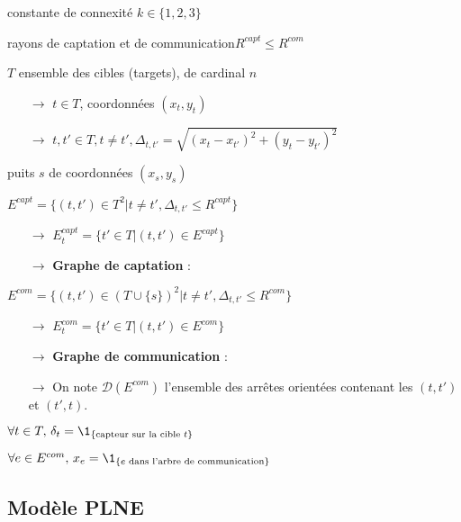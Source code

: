 \documentclass[12pt]{article}
\begin{document}
\begin{bulletlist}
  \item constante de connexité $k\in \{1, 2, 3\}$
  \item rayons de captation et de communication$R^{capt} \leq R^{com}$
  \item $T$ ensemble des cibles (targets), de cardinal $n$
  \begin{itemize}
    \item[$\rightarrow$] $t\in T$, coordonnées $(x_t, y_t)$
    \item[$\rightarrow$] $t, t'\in T, t\neq t', \Delta_{t, t'} = \sqrt{(x_t - x_{t'})^2 + (y_t - y_{t'})^2}$
  \end{itemize}
  \item puits $s$ de coordonnées $(x_s, y_s)$
  \item $E^{capt} = \{(t, t')\in T^2 | t\neq t', \Delta_{t, t'} \leq R^{capt}\}$
  \begin{itemize}
    \item[$\rightarrow$] $E^{capt}_t = \{t'\in T | (t, t')\in E^{capt}\}$
    \item[$\rightarrow$] \textbf{Graphe de captation} :  
  \end{itemize}
  \item $E^{com} = \{ (t, t')\in (T \cup \{ s \})^2 | t\neq t', \Delta_{t, t'} \leq R^{com} \}$
  \begin{itemize}
    \item[$\rightarrow$] $E^{com}_t = \{t'\in T | (t, t')\in E^{com}\}$
    \item[$\rightarrow$] \textbf{Graphe de communication} : 
    \item[$\rightarrow$] On note $\mathcal{D}(E^{com})$ l'ensemble des arrêtes orientées contenant les $(t, t')$ et $(t', t)$.
  \end{itemize}
  \item $\forall t\in T,\, \delta_t = \1_{\{\text{capteur sur la cible } t\}}$
  \item $\forall e\in E^{com},\, x_e = \1_{\{e \text{ dans l'arbre de communication}\}}$
\end{bulletlist}

\subsection{Modèle PLNE}
\end{document}

